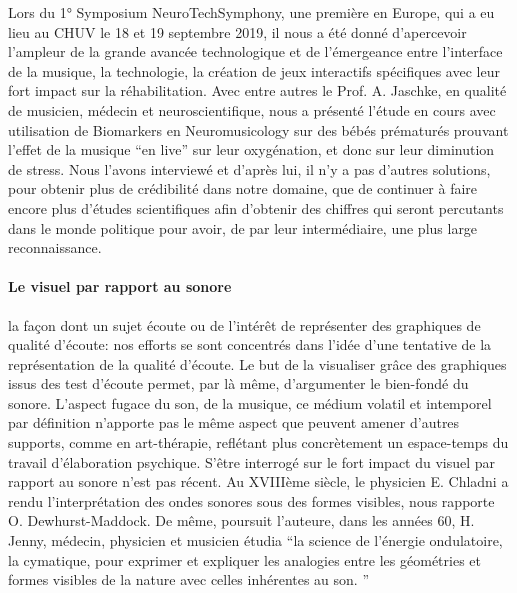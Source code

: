 Lors du 1° Symposium
 NeuroTechSymphony, une première en Europe, qui a eu lieu au CHUV le 18 et 19 septembre 2019, il 
 nous a été
 donné d'apercevoir l'ampleur de la grande avancée technologique
 et de l'émergeance entre l'interface de la musique, la technologie, la
 création de jeux interactifs spécifiques avec leur fort impact sur la
 réhabilitation. Avec entre autres le Prof. A. Jaschke, en qualité de musicien, médecin et 
 neuroscientifique, nous a  présenté l'étude en cours avec utilisation de
Biomarkers en Neuromusicology sur des
bébés prématurés prouvant l'effet de la musique ``en live'' sur leur
oxygénation, et donc sur leur diminution de stress. Nous l'avons interviewé et d'après lui, il n'y a pas 
d'autres solutions, pour obtenir plus de crédibilité dans notre domaine, que de continuer à faire encore 
plus d'études scientifiques afin d'obtenir des chiffres qui seront percutants dans le monde politique pour 
avoir, de par leur intermédiaire, une plus large reconnaissance.




\paragraph{Le visuel par rapport au sonore}  
	la façon dont un sujet écoute ou de l'intérêt de représenter des graphiques de
qualité d'écoute: 
nos efforts se sont concentrés dans l'idée d'une tentative de la représentation de la  qualité d'écoute. Le 
but de la visualiser %
grâce  des 
graphiques issus des test d'écoute  permet, par là même, d'argumenter le bien-fondé du sonore. %
L'aspect fugace du son, de la musique, ce médium volatil et
intemporel par
définition n'apporte pas le
même aspect que peuvent amener d'autres supports, comme en art-thérapie, 
reflétant plus concrètement un espace-temps du travail d'élaboration
psychique.
S'être interrogé sur le fort impact du visuel par rapport au sonore n'est pas récent. Au XVIIIème siècle, le 
physicien E. Chladni a rendu l'interprétation des ondes sonores sous des formes visibles, nous 
rapporte O. Dewhurst-Maddock. De même, poursuit l'auteure, dans les années 60, H. Jenny, 
médecin, physicien et musicien étudia  ``la science de l'énergie ondulatoire, la cymatique, pour exprimer 
et expliquer les analogies entre les géométries et formes visibles de la nature avec celles inhérentes au 
son. ''\autocite [30] {Dewhurst}

